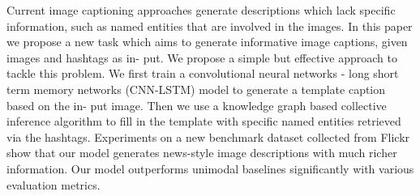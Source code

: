 Current image captioning approaches generate descriptions which lack specific information, such as named entities that are involved in the images. In this paper we propose a new task which aims to generate informative image captions, given images and hashtags as in- put. We propose a simple but effective approach to tackle this problem. We first train a convolutional neural networks - long short term memory networks (CNN-LSTM) model to generate a template caption based on the in- put image. Then we use a knowledge graph based collective inference algorithm to fill in the template with specific named entities retrieved via the hashtags. Experiments on a new benchmark dataset collected from Flickr show that our model generates news-style image descriptions with much richer information. Our model outperforms unimodal baselines significantly with various evaluation metrics.
